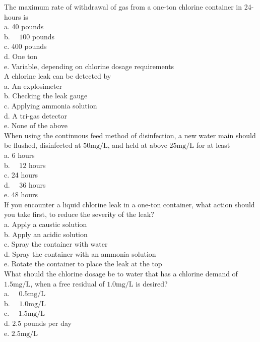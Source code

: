 The maximum rate of withdrawal of gas from a one-ton chlorine container in 24-hours is\\
a. 40 pounds\\
b. $\quad 100$ pounds\\
c. 400 pounds\\
d. One ton\\
e. Variable, depending on chlorine dosage requirements\\

A chlorine leak can be detected by\\
a. An explosimeter\\
b. Checking the leak gauge\\
c. Applying ammonia solution\\
d. A tri-gas detector\\
e. None of the above\\

When using the continuous feed method of disinfection, a new water main should be flushed, disinfected at $50 \mathrm{mg} / \mathrm{L}$, and held at above $25 \mathrm{mg} / \mathrm{L}$ for at least\\
a. 6 hours\\
b. $\quad 12$ hours\\
c. 24 hours\\
d. $\quad 36$ hours\\
e. 48 hours\\

If you encounter a liquid chlorine leak in a one-ton container, what action should you take first, to reduce the severity of the leak?\\
a. Apply a caustic solution\\
b. Apply an acidic solution\\
c. Spray the container with water\\
d. Spray the container with an ammonia solution\\
e. Rotate the container to place the leak at the top\\

What should the chlorine dosage be to water that has a chlorine demand of $1.5 \mathrm{mg} / \mathrm{L}$, when a free residual of $1.0 \mathrm{mg} / \mathrm{L}$ is desired?\\
a. $\quad 0.5 \mathrm{mg} / \mathrm{L}$\\
b. $\quad 1.0 \mathrm{mg} / \mathrm{L}$\\
c. $\quad 1.5 \mathrm{mg} / \mathrm{L}$\\
d. $2.5$ pounds per day\\
e. $2.5 \mathrm{mg} / \mathrm{L}$\\

